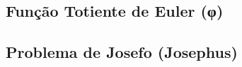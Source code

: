 \subsection{Função Totiente de Euler (φ)}


% 

% 

% 

% 

\subsection{Problema de Josefo (Josephus)}


% 

% 

% 

% 

